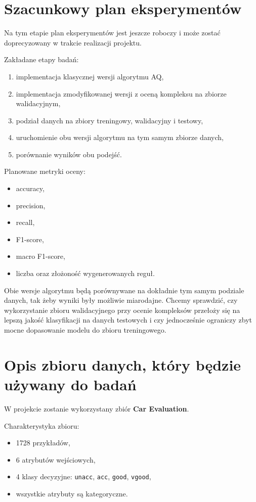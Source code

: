 \documentclass[12pt,a4paper]{article}
\begin{document}
\section{Szacunkowy plan eksperymentów}

Na tym etapie plan eksperymentów jest jeszcze roboczy i może zostać doprecyzowany w trakcie realizacji projektu.

Zakładane etapy badań:
\begin{enumerate}
  \item implementacja klasycznej wersji algorytmu AQ,
  \item implementacja zmodyfikowanej wersji z oceną kompleksu na zbiorze walidacyjnym,
  \item podział danych na zbiory treningowy, walidacyjny i testowy,
  \item uruchomienie obu wersji algorytmu na tym samym zbiorze danych,
  \item porównanie wyników obu podejść.
\end{enumerate}

Planowane metryki oceny:
\begin{itemize}
  \item accuracy,
  \item precision,
  \item recall,
  \item F1-score,
  \item macro F1-score,
  \item liczba oraz złożoność wygenerowanych reguł.
\end{itemize}

Obie wersje algorytmu będą porównywane na dokładnie tym samym podziale danych, tak żeby wyniki były możliwie miarodajne. Chcemy sprawdzić, czy wykorzystanie zbioru walidacyjnego przy ocenie kompleksów przełoży się na lepszą jakość klasyfikacji na danych testowych i czy jednocześnie ograniczy zbyt mocne dopasowanie modelu do zbioru treningowego.

\section{Opis zbioru danych, który będzie używany do badań}

W projekcie zostanie wykorzystany zbiór \textbf{Car Evaluation}.

Charakterystyka zbioru:
\begin{itemize}
  \item 1728 przykładów,
  \item 6 atrybutów wejściowych,
  \item 4 klasy decyzyjne: \texttt{unacc}, \texttt{acc}, \texttt{good}, \texttt{vgood},
  \item wszystkie atrybuty są kategoryczne.
\end{itemize}
\end{document}
